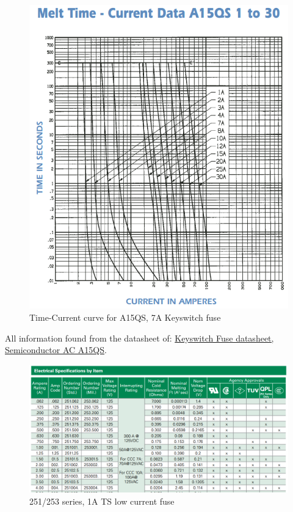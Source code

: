 \documentclass{article}
\begin{document}
{\begin{figure}
    \centering
    \includegraphics[width = 0.7 \textwidth]{Keyswitchmeltingtime}
    \caption{Time-Current curve for A15QS, 7A Keyswitch fuse}
    \label{keyswitchcurve}
\end{figure}

All information found from the datasheet of:
\href{http://www.allfuses.com/media/documents/Ferraz\%20A15QS.pdf}{Keyswitch Fuse datasheet, Semiconductor AC A15QS}.

\begin{figure}[H]
    \centering
    \includegraphics[width = 0.6 \textwidth]{TSsmallratings}
    \caption{251/253 series, 1A TS low current fuse}
    \label{tssmallratings}
\end{figure}

}
\end{document}
